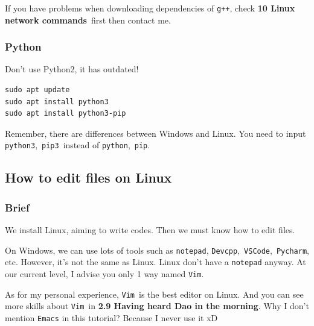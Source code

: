 \documentclass[12pt]{ctexart}
\newenvironment{mdquote}
{%
  \par\noindent
  \begin{list}{}{%
      \setlength{\leftmargin}{1em}%
      \setlength{\rightmargin}{0pt}%
      \setlength{\itemindent}{0pt}%
      \setlength{\listparindent}{\parindent}%
      \setlength{\topsep}{0.5\baselineskip}%
  }
  \item[\textbf{>}\ ]\itshape
}
{\end{list}\par}
\begin{document}
\begin{mdquote}
If you have problems when downloading dependencies of \texttt{g++}, check
\textbf{10 Linux network commands}\ first then contact me.
\end{mdquote}

\subsubsection{\textbf{Python}}

\begin{mdquote}
Don't use Python2, it has outdated!
\end{mdquote}

\begin{adjustwidth}{2em}{0pt}
\begin{verbatim}
sudo apt update
sudo apt install python3
sudo apt install python3-pip
\end{verbatim}
\end{adjustwidth}

Remember, there are differences between Windows and Linux. You need to
input \texttt{python3},\ \texttt{pip3}\ instead of \texttt{python},\
\texttt{pip}.

\subsection{\textbf{How to edit files on Linux}}

\subsubsection{\textbf{Brief}}

We install Linux, aiming to write codes. Then we must know how to edit
files.

On Windows, we can use lots of tools such as \texttt{notepad},
\texttt{Devcpp},\ \texttt{VSCode},\ \texttt{Pycharm}, etc. However,
it's not the same as Linux. Linux don't
have a \texttt{notepad} anyway. At our current level, I advise you only
1 way named \texttt{Vim}.

\begin{mdquote}
As for my personal experience, \texttt{Vim}\ is the best editor on Linux.
And you can see more skills about \texttt{Vim}\ in 
\textbf{2.9 Having heard Dao in the morning}.
Why I don't mention \texttt{Emacs} in this tutorial? Because I never use it xD
\end{mdquote}
\end{document}
